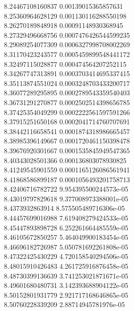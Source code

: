 {8.24467108160837 0.00139015365857631 \\
8.25360964628129 0.001130116288550198 \\
8.26270189848918 0.00091148930368945 \\
8.27329496668756 0.0007476426544599235 \\
8.29089254077309 0.0006327998708002269 \\
8.31170423243577 0.0005459899548441172 \\
8.32497115028877 0.000474564207252115 \\
8.34267747313891 0.0003703414695337415 \\
8.35113874551024 0.0003248703433200717 \\
8.36077289295895 0.0002789543359540403 \\
8.36731291270877 0.0002502514398656785 \\
8.37425354049299 0.0002222561597591266 \\
8.37915251650168 0.0002041714760707691 \\
8.38442116658541 0.0001874318986665457 \\
8.38985396149667 0.0001720461150398478 \\
8.39676920301667 0.0001535845949547365 \\
8.40343028501366 0.000136803078930825 \\
8.41249545901559 0.0001165126086561941 \\
8.41868586899187 0.0001056493201758713 \\
8.42406716782722 9.954395500244573e-05 \\
8.43019797829618 9.377008973388001e-05 \\
8.4373932863914 8.575505489716306e-05 \\
8.44457699016988 7.619408279424533e-05 \\
8.45447893898728 6.252261664485559e-05 \\
8.46105672850257 5.464049900183454e-05 \\
8.46696182726987 5.050781692261808e-05 \\
8.47322425430229 4.720158540294506e-05 \\
8.48015910426483 4.261725916876458e-05 \\
8.48730399136639 3.741253021871671e-05 \\
8.49601680480731 3.142393688904122e-05 \\
8.50152801931779 2.921717168646865e-05 \\
8.50760228339209 2.88714945781976e-05 \\
}
